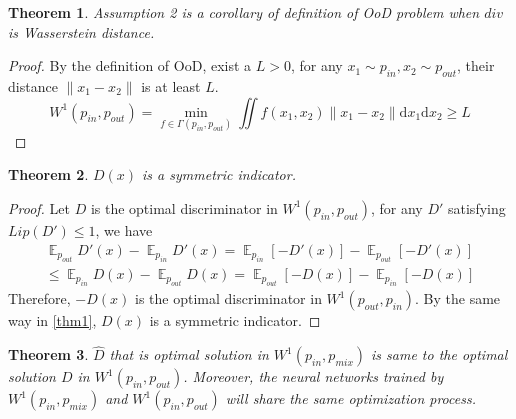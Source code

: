 \documentclass[a3paper]{article}
\newtheorem{theorem}{Theorem}
\newtheorem*{proof}{\it{Proof.}\rm}
\newcommand{\dd}{\mathrm{d}}
\newcommand{\E}{\operatorname{\mathbb{E}}}
\newcommand{\pin}{p_{in}}
\newcommand{\pout}{p_{out}}
\newcommand{\pmix}{p_{mix}}
\begin{document}
\begin{theorem}\label{thm6}
	Assumption 2 is a corollary of definition of OoD problem when $div$ is Wasserstein distance.
\end{theorem}
\begin{proof}
	By the definition of OoD, exist a $L > 0$, for any $x_1 \sim \pin, x_2 \sim \pout$, their distance $\|x_1 - x_2\|$ is at least $L$. 
	\begin{equation*}
		 W^1(\pin, \pout) = \min_{f \in \Gamma(\pin, \pout)} \iint f(x_1, x_2) \|x_1 - x_2\| \dd x_1 \dd x_2 \geq L
	\end{equation*}
\end{proof}

\begin{theorem}\label{thm7}
	$D(x)$ is a symmetric indicator.
\end{theorem}
\begin{proof}
	Let $D$ is the optimal discriminator in $W^1(\pin, \pout)$, for any $D'$ satisfying $Lip(D') \leq 1$, we have
	\begin{align*}
		\E_{\pout} D'(x) - \E_{\pin} D'(x) = \E_{\pin} [-D'(x)] - \E_{\pout} [-D'(x)] \\
		\leq  \E_{\pin} D(x) - \E_{\pout} D(x) =  \E_{\pout} [-D(x)] - \E_{\pin} [-D(x)] 
	\end{align*}
	Therefore, $-D(x)$ is the optimal discriminator in $W^1(\pout, \pin)$. By the same way in \cref{thm1}, 
	$D(x)$ is a symmetric indicator.
\end{proof}

\begin{theorem}\label{thm8}
	$\hat{D}$ that is optimal solution in $W^1(\pin, \pmix)$ is same to the optimal solution $D$ in $W^1(\pin, \pout)$. Moreover, the neural networks trained by $W^1(\pin, \pmix)$ and $W^1(\pin, \pout)$ will share the same optimization process.
\end{theorem}
\end{document}
